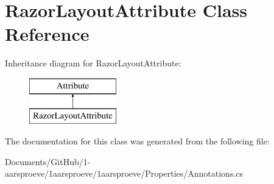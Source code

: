 \hypertarget{class_razor_layout_attribute}{}\section{Razor\+Layout\+Attribute Class Reference}
\label{class_razor_layout_attribute}
Inheritance diagram for Razor\+Layout\+Attribute\+:\begin{figure}[H]
\begin{center}
\leavevmode
\includegraphics[height=2.000000cm]{class_razor_layout_attribute}
\end{center}
\end{figure}


The documentation for this class was generated from the following file\+:\begin{DoxyCompactItemize}
\item 
Documents/\+Git\+Hub/1-\/aarsproeve/1aarsproeve/1aarsproeve/\+Properties/Annotations.\+cs\end{DoxyCompactItemize}
